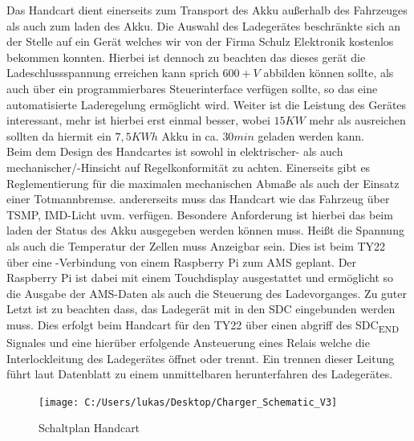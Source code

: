 Das Handcart dient einerseits zum Transport des Akku außerhalb des Fahrzeuges als auch zum laden des Akku. Die Auswahl des Ladegerätes beschränkte sich an der Stelle auf ein Gerät welches wir von der Firma Schulz Elektronik kostenlos bekommen konnten. Hierbei ist dennoch zu beachten das dieses gerät die Ladeschlussspannung erreichen kann sprich \ensuremath{600+ V} abbilden können sollte, als auch über ein programmierbares Steuerinterface verfügen sollte, so das eine automatisierte Laderegelung ermöglicht wird. Weiter ist die Leistung des Gerätes interessant, mehr ist hierbei erst einmal besser, wobei \ensuremath{15 KW} mehr als ausreichen sollten da hiermit ein \ensuremath{7,5 KWh} Akku in ca. \ensuremath{30 min} geladen werden kann.\\
Beim dem Design des Handcartes ist sowohl in elektrischer- als auch mechanischer/-Hinsicht auf Regelkonformität zu achten. Einerseits gibt es Reglementierung für die maximalen mechanischen Abmaße als auch der Einsatz einer Totmannbremse. andererseits muss das Handcart wie das Fahrzeug über \ac{TSMP}, \ac{IMD}-Licht uvm. verfügen. Besondere Anforderung ist hierbei das beim laden der Status des Akku ausgegeben werden können muss. Heißt die Spannung als auch die Temperatur der Zellen muss Anzeigbar sein. Dies ist beim TY22 über eine -Verbindung von einem Raspberry Pi zum \ac{AMS} geplant. Der Raspberry Pi ist dabei mit einem Touchdisplay ausgestattet und ermöglicht so die Ausgabe der \ac{AMS}-Daten als auch die Steuerung des Ladevorganges. Zu guter Letzt ist zu beachten dass, das Ladegerät mit in den \ac{SDC} eingebunden werden muss. Dies erfolgt beim Handcart für den TY22 über einen abgriff des \ac{SDC}\textsubscript{END} Signales und eine hierüber erfolgende Ansteuerung eines Relais welche die Interlockleitung des Ladegerätes öffnet oder trennt. Ein trennen dieser Leitung führt laut Datenblatt zu einem unmittelbaren herunterfahren des Ladegerätes.

\begin{figure}
	\centering
	\texttt{[image: C:/Users/lukas/Desktop/Charger\_Schematic\_V3]}
	\caption{Schaltplan Handcart}
	\label{fig:chargerschematicv3}
\end{figure}

\FloatBarrier
